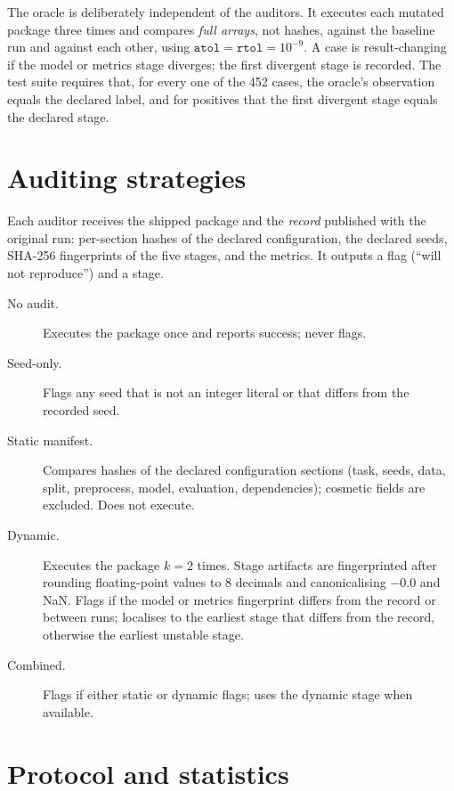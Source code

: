 \documentclass[11pt]{article}
\begin{document}
The oracle is deliberately independent of the auditors. It executes each mutated package three times and compares \emph{full arrays}, not hashes, against the baseline run and against each other, using $\texttt{atol}=\texttt{rtol}=10^{-9}$. A case is result-changing if the model or metrics stage diverges; the first divergent stage is recorded. The test suite requires that, for every one of the 452 cases, the oracle's observation equals the declared label, and for positives that the first divergent stage equals the declared stage.

\section{Auditing strategies}
\label{sec:auditors}

Each auditor receives the shipped package and the \emph{record} published with the original run: per-section hashes of the declared configuration, the declared seeds, SHA-256 fingerprints of the five stages, and the metrics. It outputs a flag (``will not reproduce'') and a stage.

\begin{description}
  \item[No audit.] Executes the package once and reports success; never flags.
  \item[Seed-only.] Flags any seed that is not an integer literal or that differs from the recorded seed.
  \item[Static manifest.] Compares hashes of the declared configuration sections (task, seeds, data, split, preprocess, model, evaluation, dependencies); cosmetic fields are excluded. Does not execute.
  \item[Dynamic.] Executes the package $k=2$ times. Stage artifacts are fingerprinted after rounding floating-point values to 8 decimals and canonicalising $-0.0$ and NaN. Flags if the model or metrics fingerprint differs from the record or between runs; localises to the earliest stage that differs from the record, otherwise the earliest unstable stage.
  \item[Combined.] Flags if either static or dynamic flags; uses the dynamic stage when available.
\end{description}

\section{Protocol and statistics}
\end{document}
